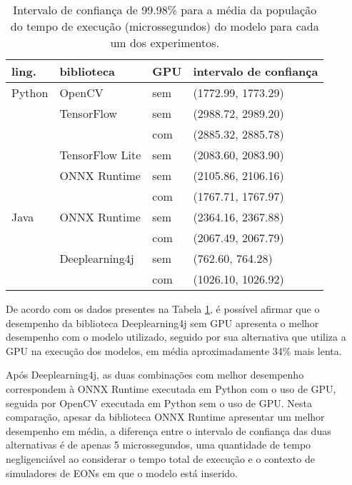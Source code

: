 \begin{table}
    \centering
    \begin{tabular}{llll}
        \toprule
        ling.  & biblioteca      & GPU & intervalo de confiança \\
        \midrule
        Python & OpenCV          & sem & (1772.99, 1773.29)     \\
               & TensorFlow      & sem & (2988.72, 2989.20)     \\
               &                 & com & (2885.32, 2885.78)     \\
               & TensorFlow Lite & sem & (2083.60, 2083.90)     \\
               & ONNX Runtime    & sem & (2105.86, 2106.16)     \\
               &                 & com & (1767.71, 1767.97)     \\
        Java   & ONNX Runtime    & sem & (2364.16, 2367.88)     \\
               &                 & com & (2067.49, 2067.79)     \\
               & Deeplearning4j  & sem & (762.60, 764.28)       \\
               &                 & com & (1026.10, 1026.92)     \\

        \bottomrule
    \end{tabular}
    \caption{Intervalo de confiança de 99.98\% para a média da população do tempo de execução (microssegundos) do modelo para cada um dos experimentos.}
    \label{tab:ci}
\end{table}

De acordo com os dados presentes na Tabela \ref{tab:ci}, é possível afirmar que o desempenho da biblioteca Deeplearning4j sem GPU apresenta o melhor desempenho com o modelo utilizado, seguido por sua alternativa que utiliza a GPU na execução dos modelos, em média aproximadamente 34\% mais lenta.

Após Deeplearning4j, as duas combinações com melhor desempenho correspondem à ONNX Runtime executada em Python com o uso de GPU, seguida por OpenCV executada em Python sem o uso de GPU. Nesta comparação, apesar da biblioteca ONNX Runtime apresentar um melhor desempenho em média, a diferença entre o intervalo de confiança das duas alternativas é de apenas 5 microssegundos, uma quantidade de tempo negligenciável ao considerar o tempo total de execução e o contexto de simuladores de EONs em que o modelo está inserido.

